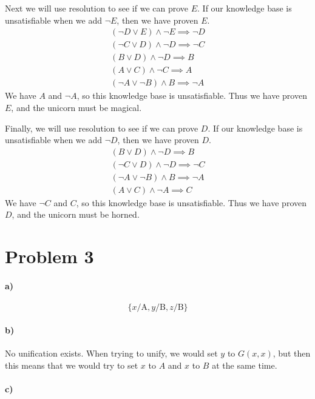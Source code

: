 \documentclass[12pt]{article}
\begin{document}
Next we will use resolution to see if we can prove \(E\). If our knowledge base is unsatisfiable when we add \(\neg E\), then we have proven \(E\).
\begin{gather*}
        (\neg D \lor E)\land\neg E\implies\neg D\\
        (\neg C \lor D)\land\neg D\implies\neg C\\
        (B \lor D)\land\neg D\implies B\\
        (A \lor C)\land\neg C\implies A\\
        (\neg A \lor \neg B)\land B\implies\neg A
\end{gather*}
We have \(A\) and \(\neg A\), so this knowledge base is unsatisfiable. Thus we have proven \(E\), and the unicorn must be magical.

Finally, we will use resolution to see if we can prove \(D\). If our knowledge base is unsatisfiable when we add \(\neg D\), then we have proven \(D\).
\begin{gather*}
        (B \lor D)\land\neg D\implies B\\
        (\neg C \lor D)\land\neg D\implies\neg C\\
        (\neg A \lor \neg B)\land B\implies\neg A\\
        (A \lor C)\land\neg A\implies C
\end{gather*}
We have \(\neg C\) and \(C\), so this knowledge base is unsatisfiable. Thus we have proven \(D\), and the unicorn must be horned.

\section*{Problem 3}

\paragraph{a)}

\[\{x/\text{A},y/\text{B},z/\text{B}\}\]

\paragraph{b)}

No unification exists. When trying to unify, we would set \(y\) to \(G(x,x)\), but then this means that we would try to set \(x\) to \(A\) and
\(x\) to \(B\) at the same time.

\paragraph{c)}
\end{document}
